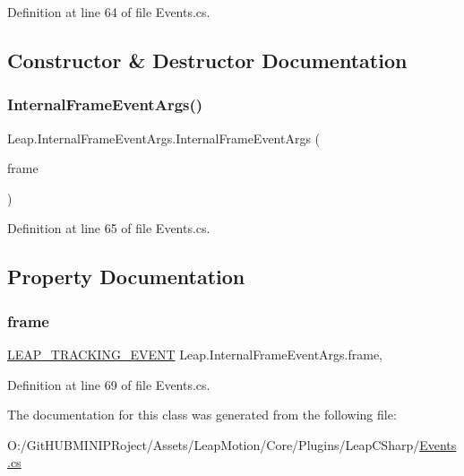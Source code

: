 Definition at line 64 of file Events.\+cs.



\subsection{Constructor \& Destructor Documentation}
\mbox{\label{class_leap_1_1_internal_frame_event_args_afdcf6e8d248995894975396c3b1fa9a8}} 
\subsubsection{\texorpdfstring{InternalFrameEventArgs()}{InternalFrameEventArgs()}}
{\footnotesize\ttfamily Leap.\+Internal\+Frame\+Event\+Args.\+Internal\+Frame\+Event\+Args (\begin{DoxyParamCaption}\item[{ref \mbox{\hyperlink{struct_leap_internal_1_1_l_e_a_p___t_r_a_c_k_i_n_g___e_v_e_n_t}{L\+E\+A\+P\+\_\+\+T\+R\+A\+C\+K\+I\+N\+G\+\_\+\+E\+V\+E\+NT}}}]{frame }\end{DoxyParamCaption})}



Definition at line 65 of file Events.\+cs.



\subsection{Property Documentation}
\mbox{\label{class_leap_1_1_internal_frame_event_args_ad4466ce1fb0119ae61135dd8a1f7d966}} 
\subsubsection{\texorpdfstring{frame}{frame}}
{\footnotesize\ttfamily \mbox{\hyperlink{struct_leap_internal_1_1_l_e_a_p___t_r_a_c_k_i_n_g___e_v_e_n_t}{L\+E\+A\+P\+\_\+\+T\+R\+A\+C\+K\+I\+N\+G\+\_\+\+E\+V\+E\+NT}} Leap.\+Internal\+Frame\+Event\+Args.\+frame\hspace{0.3cm}{\ttfamily [get]}, {\ttfamily [set]}}



Definition at line 69 of file Events.\+cs.



The documentation for this class was generated from the following file\+:\begin{DoxyCompactItemize}
\item 
O\+:/\+Git\+H\+U\+B\+M\+I\+N\+I\+P\+Roject/\+Assets/\+Leap\+Motion/\+Core/\+Plugins/\+Leap\+C\+Sharp/\mbox{\hyperlink{_events_8cs}{Events.\+cs}}\end{DoxyCompactItemize}
